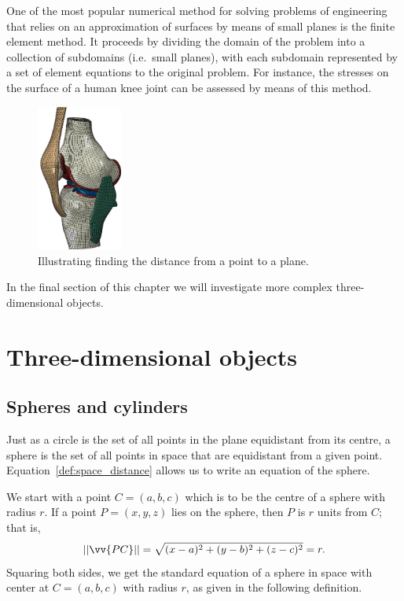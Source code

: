 \begin{remark}
One of the most popular  numerical method for solving problems of engineering that relies on an approximation of surfaces by means of small planes is the finite element method. It proceeds by  dividing the domain of the problem into a collection of subdomains (i.e.\ small planes), with each subdomain represented by a set of element equations to the original problem. For instance, the stresses on the surface of a human knee joint can be assessed by means of this method.

\begin{figure}[H]
	\begin{center}
			\includegraphics[width=0.25\textwidth]{fig_ana_geo_9}
	\caption{Illustrating finding the distance from a point to a plane.}
	\label{fig_ana_geo_9}
	\end{center}
\end{figure}


\end{remark}

In the final section of this chapter we will investigate more complex three-dimensional objects.

\section{Three-dimensional objects}
\label{sec_lichamen}
\subsection{Spheres and cylinders}
Just as a circle is the set of all points in the plane equidistant from its centre, a sphere is the set of all points in space that are equidistant from a given point. Equation~\eqref{def:space_distance} allows us to write an equation of the sphere.

We start with a point $C = (a,b,c)$ which is to be the centre of a sphere with radius $r$. If a point $P=(x,y,z)$ lies on the sphere, then $P$ is $r$ units from $C$; that is, 
$$||\vv{PC}|| = \sqrt{(x-a)^2+(y-b)^2+(z-c)^2} = r.$$
Squaring both sides, we get the standard equation of a sphere in space with center at $C=(a,b,c)$ with radius $r$, as given in the following definition.

